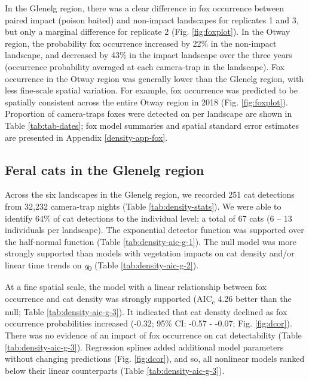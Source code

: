 \documentclass[11pt,a4paper,titlepage,twoside,openright]{style/unimelbthesis}
\begin{document}
\begin{mainmatter}
In the Glenelg region, there was a clear difference in fox occurrence between paired impact (poison baited) and non-impact landscapes for replicates 1 and 3, but only a marginal difference for replicate 2 (Fig. \ref{fig:foxplot}). In the Otway region, the probability fox occurrence increased by 22\% in the non-impact landscape, and decreased by 43\% in the impact landscape over the three years (occurrence probability averaged at each camera-trap in the landscape). Fox occurrence in the Otway region was generally lower than the Glenelg region, with less fine-scale spatial variation. For example, fox occurrence was predicted to be spatially consistent across the entire Otway region in 2018 (Fig. \ref{fig:foxplot}). Proportion of camera-traps foxes were detected on per landscape are shown in Table \ref{tab:tab-dates}; fox model summaries and spatial standard error estimates are presented in Appendix \ref{density-app-fox}.

\hypertarget{feral-cats-in-the-glenelg-region}{%
\subsection{Feral cats in the Glenelg region}\label{feral-cats-in-the-glenelg-region}}

Across the six landscapes in the Glenelg region, we recorded 251 cat detections from 32,232 camera-trap nights (Table \ref{tab:density-stats}). We were able to identify 64\% of cat detections to the individual level; a total of 67 cats (6 -- 13 individuals per landscape). The exponential detector function was supported over the half-normal function (Table \ref{tab:density-aic-g-1}). The null model was more strongly supported than models with vegetation impacts on cat density and/or linear time trends on \emph{g}\textsubscript{0} (Table \ref{tab:density-aic-g-2}).

At a fine spatial scale, the model with a linear relationship between fox occurrence and cat density was strongly supported (AIC\textsubscript{c} 4.26 better than the null; Table \ref{tab:density-aic-g-3}). It indicated that cat density declined as fox occurrence probabilities increased (-0.32; 95\% CI: -0.57 - -0.07; Fig. \ref{fig:dcor}). There was no evidence of an impact of fox occurrence on cat detectability (Table \ref{tab:density-aic-g-3}). Regression splines added additional model parameters without changing predictions (Fig. \ref{fig:dcor}), and so, all nonlinear models ranked below their linear counterparts (Table \ref{tab:density-aic-g-3}).


\end{mainmatter}
\end{document}
